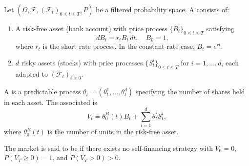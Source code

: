\begin{definition} \label{definition:market_model_with_risk_free_asset_and_risky_assets}
Let $(\Omega, \mathcal{F}, (\mathcal{F}_t)_{0 \leq t \leq T}, P)$ be a filtered probability space. A  consists of:

\begin{enumerate}
    \item A risk-free asset (bank account) with price process $\{B_t\}_{0 \leq t \leq T}$ satisfying
    $$dB_t = r_t B_t \, dt, \quad B_0 = 1,$$
    where $r_t$ is the short rate process. In the constant-rate case, $B_t = e^{rt}$.

    \item $d$ risky assets (stocks) with price processes $\{S_t^i\}_{0 \leq t \leq T}$ for $i = 1, \dots, d$, each adapted to $(\mathcal{F}_t)_{t \geq 0}$.
\end{enumerate}

A  is a predictable process $\theta_t = (\theta_t^1, \dots, \theta_t^d)$ specifying the number of shares held in each asset. The associated  is
$$V_t = \theta_0^B(t) B_t + \sum_{i=1}^d \theta_t^i S_t^i,$$
where $\theta_0^B(t)$ is the number of units in the risk-free asset.

The market is said to be  if there exists no self-financing strategy with $V_0 = 0$, $P(V_T \geq 0) = 1$, and $P(V_T > 0) > 0$.
\end{definition}